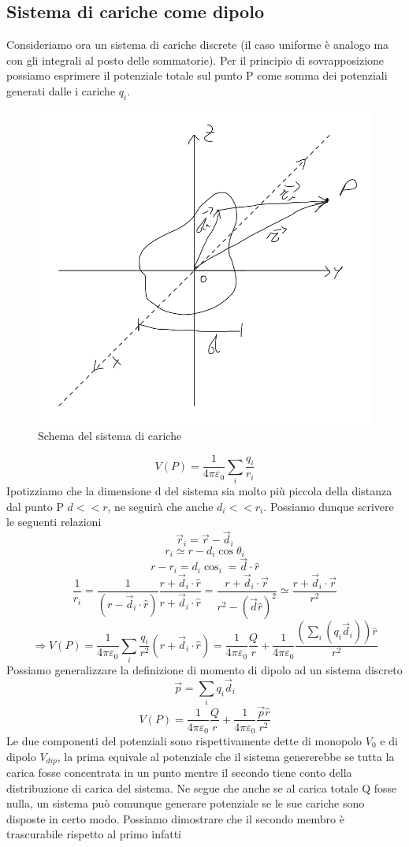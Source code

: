 \documentclass[10pt,a4paper]{article}
\begin{document}
\subsection{Sistema di cariche come dipolo}
Consideriamo ora un sistema di cariche discrete (il caso uniforme è analogo ma con gli integrali al posto delle sommatorie). Per il principio di sovrapposizione possiamo esprimere il potenziale totale sul punto P come somma dei potenziali generati dalle i cariche \(q_i\).
\begin{figure}[h!]
	\centering
	\includegraphics[width=0.5\linewidth]{images/sistema_dipolo}
	\caption{Schema del sistema di cariche}
	\label{fig:sistemadipolo}
\end{figure}
\FloatBarrier
\[V(P) = \frac{1}{4\pi\varepsilon_0}\sum_i \frac{q_i}{r_i}\]
Ipotizziamo che la dimensione d del sistema sia molto più piccola della distanza dal punto P \(d<<r\), ne seguirà che anche \(d_i<<r_i\). Possiamo dunque scrivere le seguenti relazioni
 \[\vec{r}_i = \vec{r} - \vec{d}_i\]
 \[r_i \simeq r-d_i\cos\theta_i\]
 \[r-r_i = d_i\cos_i = \vec{d}\cdot\hat{r}\]
 \[\frac{1}{r_i} = \frac{1}{(r-\vec{d}_i\cdot\hat{r})}\frac{r+\vec{d}_i\cdot\hat{r}}{r+\vec{d}_i\cdot\hat{r}} = \frac{r+\vec{d}_i\cdot\vec{r}}{r^2-(\vec{d}\hat{r})^2} \simeq \frac{r+\vec{d}_i\cdot\vec{r}}{r^2}\]
 \[\Rightarrow V(P) =\frac{1}{4\pi\varepsilon_0}\sum_i \frac{q_i}{r^2}(r+\vec{d}_i\cdot\hat{r}) = \frac{1}{4\pi\varepsilon_0}\frac{Q}{r}+\frac{1}{4\pi\varepsilon_0}\frac{(\sum_i(q_i\vec{d}_i))\hat{r}}{r^2}\]
 Possiamo generalizzare la definizione di momento di dipolo ad un sistema discreto 
 \[\vec{p} = \sum_i q_i\vec{d}_i\]
 \[V(P) = \frac{1}{4\pi\varepsilon_0}\frac{Q}{r}+\frac{1}{4\pi\varepsilon_0}\frac{\vec{p}\hat{r}}{r^2}\]
 Le due componenti del potenziali sono rispettivamente dette di monopolo \(V_0\) e di dipolo \(V_{dip}\), la prima equivale al potenziale che il sistema genererebbe se tutta la carica fosse concentrata in un punto mentre il secondo tiene conto della distribuzione di carica del sistema. Ne segue che anche se al carica totale Q fosse nulla, un sistema può comunque generare potenziale se le sue cariche sono disposte in certo modo. Possiamo dimostrare che il secondo membro è trascurabile rispetto al primo infatti
\end{document}
